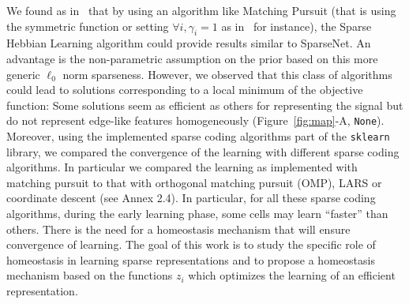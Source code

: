 \documentclass[draft]{article} %
\newcommand{\seeFig}[1]{Figure~\ref{fig:#1}}%
\begin{document}
We found as in~\citep{Rehn07} that by using an algorithm like Matching Pursuit (that is using the symmetric function or setting $\forall i, \gamma_i=1$ as in~\citep{Mairal14} for instance), the Sparse Hebbian Learning algorithm could provide results similar to {\sc SparseNet}. An advantage is the non-parametric assumption on the prior based on this more generic $\ell_0$ norm sparseness. However, we observed that this class of algorithms could lead to solutions corresponding to a local minimum of the objective function: Some solutions seem as efficient as others for representing the signal but do not represent edge-like features homogeneously (\seeFig{map}-A, \texttt{None}). %
Moreover, using the implemented sparse coding algorithms part of the \verb+sklearn+ library, we compared the convergence of the learning with different sparse coding algorithms. In particular we compared the learning as implemented with matching pursuit to that with orthogonal matching pursuit (OMP), LARS or coordinate descent (see Annex 2.4).
In particular, for all these sparse coding algorithms, during the early learning phase, some cells may learn ``faster'' than others. There is the need for a homeostasis mechanism that will ensure convergence of learning. The goal of this work is to study the specific role of homeostasis in learning sparse representations and to propose a homeostasis mechanism based on the functions $z_i$ which optimizes the learning of an efficient representation.%
\end{document}
